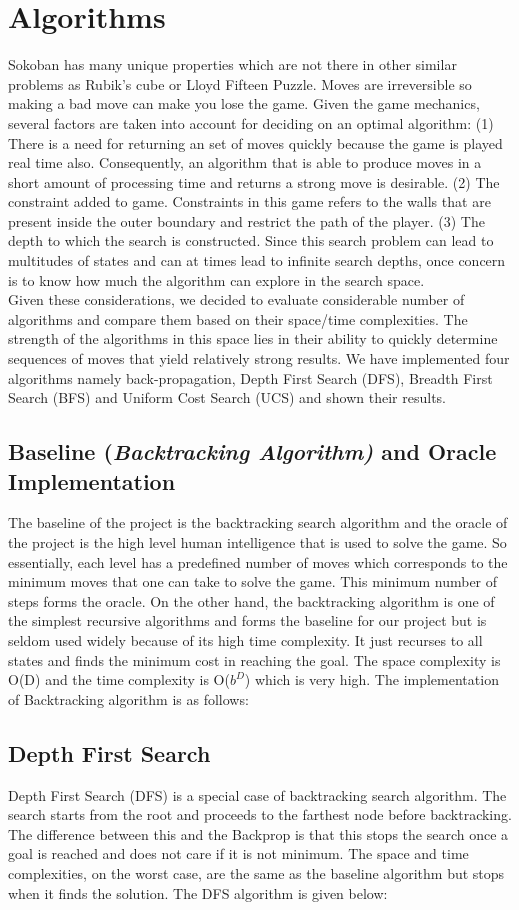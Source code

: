 \documentclass[10pt, final]{article}
\newcommand{\br}[1][.75]{\ \\[#1\baselineskip]}
\begin{document}
\section{Algorithms}
Sokoban has many unique properties which are not there in other similar problems as Rubik’s cube or Lloyd Fifteen Puzzle. Moves are irreversible so making a bad move can make you lose the game. Given the game mechanics, several factors are taken into account for deciding on an optimal algorithm:
(1) There is a need for returning an set of moves quickly because the game is played real time also. Consequently, an algorithm that is able to produce moves in a short amount of processing time and returns a strong move is desirable.
(2) The constraint added to game. Constraints in this game refers to the walls that are present inside the outer boundary and restrict the path of the player.
(3) The depth to which the search is constructed. Since this search problem can lead to multitudes of states and can at times lead to infinite search depths, once concern is to know how much the algorithm can explore in the search space. \br
Given these considerations, we decided to evaluate considerable number of algorithms and compare them based on their space/time complexities. The strength of the algorithms in this space lies in their ability to quickly determine sequences of moves that yield relatively strong results. We have implemented four algorithms namely back-propagation, Depth First Search (DFS), Breadth First Search (BFS) and Uniform Cost Search (UCS) and shown their results.
\subsection{Baseline (\textit{Backtracking Algorithm)} and Oracle Implementation}
The baseline of the project is the backtracking search algorithm and the oracle of the project is the high level human intelligence that is used to solve the game. So essentially, each level has a predefined number of moves which corresponds to the minimum moves that one can take to solve the game. This minimum number of steps forms the oracle. On the other hand, the backtracking algorithm is one of the simplest recursive algorithms and forms the baseline for our project but is seldom used widely because of its high time complexity. It just recurses to all states and finds the minimum cost in reaching the goal. The space complexity is O(D) and the time complexity is O($b^D$) which is very high. The implementation of Backtracking algorithm is as follows:
\subsection{Depth First Search}
Depth First Search (DFS) is a special case of backtracking search algorithm. The search starts from the root and proceeds to the farthest node before backtracking. The difference between this and the Backprop is that this stops the search once a goal is reached and does not care if it is not minimum. The space and time complexities, on the worst case, are the same as the baseline algorithm but stops when it finds the solution. The DFS algorithm is given below:
\end{document}
